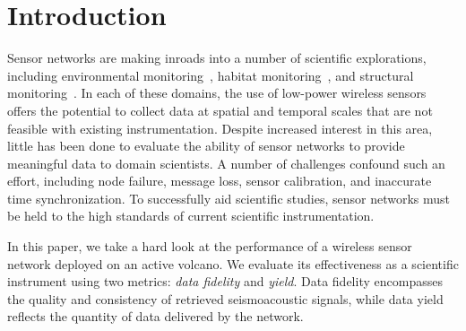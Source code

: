 \section{Introduction}


Sensor networks are making inroads into a number of scientific explorations,
including environmental monitoring~\cite{rope-emnets05,berkeley-redwoods},
habitat monitoring~\cite{cerpa-habitat,mainwaring-habitat,gdi-sensys04}, and
structural monitoring~\cite{ggb-monitoring,netshm-emnets05,wisan}.  In each
of these domains, the use of low-power wireless sensors offers the potential
to collect data at spatial and temporal scales that are not feasible with
existing instrumentation.  Despite increased interest in this area, little
has been done to evaluate the ability of sensor networks to provide
meaningful data to domain scientists. A number of challenges confound such an
effort, including node failure, message loss, sensor calibration, and
inaccurate time synchronization. To successfully aid scientific studies,
sensor networks must be held to the high standards of 
current scientific instrumentation.


In this paper, we take a hard look at the performance of a wireless sensor
network deployed on an active volcano. We evaluate its effectiveness as a
scientific instrument using two metrics: {\em data fidelity} and {\em yield}.
Data fidelity encompasses the quality and consistency of retrieved
seismoacoustic signals, while data yield reflects the quantity of data
delivered by the network. 

